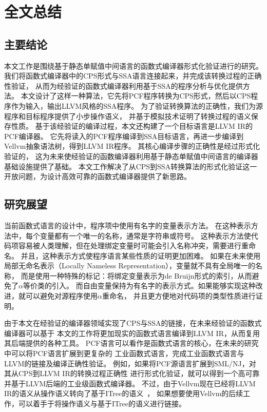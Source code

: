
\chapter{全文总结} \label{ch:summary}

\section{主要结论}

本文工作是围绕基于静态单赋值中间语言的函数式编译器形式化验证进行的研究。
我们将函数式编译器中的CPS形式与SSA语言连接起来，并完成该转换过程的正确性验证，
从而为经验证的函数式编译器利用基于SSA的程序分析与优化提供方法。
本文设计了这样一种算法，它先将PCF程序转换为CPS形式，然后以CPS程序作为输入，输出LLVM风格的SSA程序。
为了验证转换算法的正确性，我们为源程序和目标程序提供了小步操作语义，
并基于模拟技术证明了转换过程的语义保存性质。
基于该经验证的编译过程，本文还构建了一个目标语言是LLVM IR的PCF编译器。
它先将读入的PCF程序编译到SSA目标语言，再进一步编译到Vellvm抽象语法树，得到LLVM IR程序。
其核心编译步骤的正确性是经过形式化验证的，
这为未来使经验证的函数编译器利用基于静态单赋值中间语言的编译器基础设施提供了基础。
本文工作解决了从CPS到SSA转换算法的形式化验证这一开放问题，为设计高效可靠的函数式编译器提供了新思路。

\section{研究展望}

当前函数式语言的设计中，程序项中使用有名字的变量表示方法。
在这种表示方法中，每个变量都有一个唯一的名称，通常是字符串或符号。
这种表示方法使代码项容易被人类理解，但在处理绑定变量时可能会引入名称冲突，需要进行重命名。
并且，这种表示方式使程序语言某些性质的证明更加困难。
如果在未来使用局部无命名表示（Locally Nameless Representation），变量就不具有全局唯一的名称，
而是使用一种特殊的标记：将绑定变量表示为de Bruijn形式的索引，从而避免了$\alpha$等价类的引入。
而自由变量保持为有名字的表示方式。如果能够实现这种改进，就可以避免对源程序使用$\alpha$重命名，
并且更方便地对代码项的类型性质进行证明。

由于本文在经验证的编译器领域实现了CPS与SSA的链接，在未来经验证的函数式编译器可以基于
本文的工作将更加现实的函数式语言编译到LLVM IR，从而复用其后端提供的各种工具。
PCF语言可以看作是函数式语言的核心，在未来的研究中可以将PCF语言扩展到更复杂的
工业函数式语言，完成工业函数式语言与LLVM的链接及编译正确性验证。
例如，如果将PCF源语言扩展到SML/NJ，对其从CPS到LLVM IR的转换过程正确性
进行形式化验证，就可以得到一个高可靠并基于LLVM后端的工业级函数式编译器。
不过，由于Vellvm现在已经将LLVM IR的语义从操作语义转向了基于ITree的语义~\cite{itree2019,itreevellvm2021}，
如果想要使用Vellvm的后续工作，可以着手于将操作语义与基于ITree的语义进行链接。
